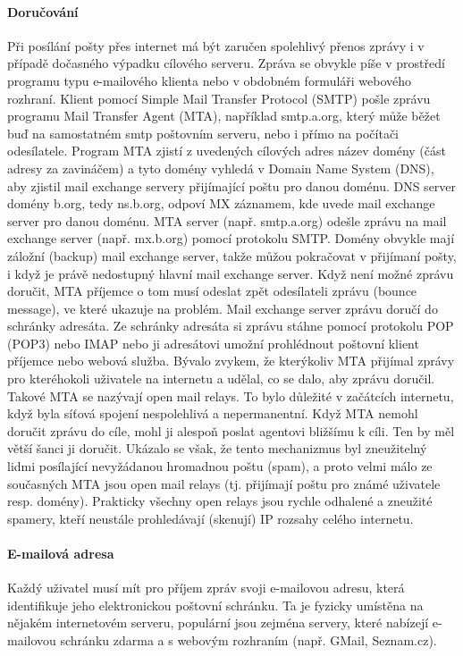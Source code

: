 \documentclass[10pt,a4paper]{article}
\begin{document}
\paragraph{Doručování}
Při posílání pošty přes internet má být zaručen spolehlivý přenos zprávy i v případě dočasného výpadku cílového serveru. Zpráva se obvykle píše v prostředí programu typu e-mailového klienta nebo v obdobném formuláři webového rozhraní. Klient pomocí Simple Mail Transfer Protocol (SMTP) pošle zprávu programu Mail Transfer Agent (MTA), například smtp.a.org, který může běžet buď na samostatném smtp poštovním serveru, nebo i přímo na počítači odesílatele. Program MTA zjistí z uvedených cílových adres název domény (část adresy za zavináčem) a tyto domény vyhledá v Domain Name System (DNS), aby zjistil mail exchange servery přijímající poštu pro danou doménu. DNS server domény b.org, tedy ns.b.org, odpoví MX záznamem, kde uvede mail exchange server pro danou doménu. MTA server (např. smtp.a.org) odešle zprávu na mail exchange server (např. mx.b.org) pomocí protokolu SMTP. Domény obvykle mají záložní (backup) mail exchange server, takže můžou pokračovat v přijímaní pošty, i když je právě nedostupný hlavní mail exchange server. Když není možné zprávu doručit, MTA příjemce o tom musí odeslat zpět odesílateli zprávu (bounce message), ve které ukazuje na problém. Mail exchange server zprávu doručí do schránky adresáta. Ze schránky adresáta si zprávu stáhne pomocí protokolu POP (POP3) nebo IMAP nebo ji adresátovi umožní prohlédnout poštovní klient příjemce nebo webová služba. Bývalo zvykem, že kterýkoliv MTA přijímal zprávy pro kteréhokoli uživatele na internetu a udělal, co se dalo, aby zprávu doručil. Takové MTA se nazývají open mail relays. To bylo důležité v začátcích internetu, když byla síťová spojení nespolehlivá a nepermanentní. Když MTA nemohl doručit zprávu do cíle, mohl ji alespoň poslat agentovi bližšímu k cíli. Ten by měl větší šanci ji doručit. Ukázalo se však, že tento mechanizmus byl zneužitelný lidmi posílající nevyžádanou hromadnou poštu (spam), a proto velmi málo ze současných MTA jsou open mail relays (tj. přijímají poštu pro známé uživatele resp. domény). Prakticky všechny open relays jsou rychle odhalené a zneužité spamery, kteří neustále prohledávají (skenují) IP rozsahy celého internetu.
\paragraph{E-mailová adresa} Každý uživatel musí mít pro příjem zpráv svoji e-mailovou adresu, která identifikuje jeho elektronickou poštovní schránku. Ta je fyzicky umístěna na nějakém internetovém serveru, populární jsou zejména servery, které nabízejí e-mailovou schránku zdarma a s webovým rozhraním (např. GMail, Seznam.cz).
\end{document}
